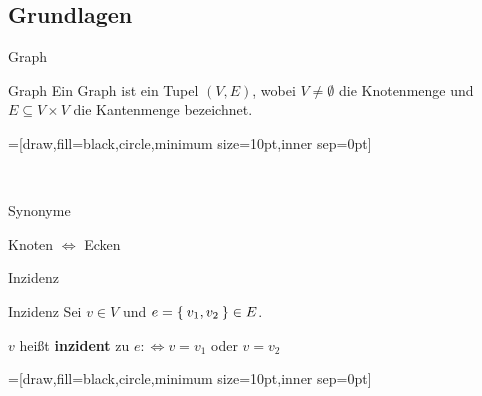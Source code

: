 \subsection{Grundlagen}
\begin{frame}{Graph}
\begin{block}{Graph}
Ein Graph ist ein Tupel $(V, E)$, wobei $V \neq \emptyset$ die Knotenmenge und 
$E \subseteq V \times V$ die 
Kantenmenge bezeichnet.
\end{block}
\pause
{}=[draw,fill=black,circle,minimum size=10pt,inner sep=0pt]

\begin{gallery}
    \\
\end{gallery}
\end{frame}

\begin{frame}{Synonyme}

\begin{center}
\Huge{Knoten $\Leftrightarrow$ Ecken}
\end{center}

\end{frame}

\begin{frame}{Inzidenz}
\begin{block}{Inzidenz}
Sei $v \in V$ und $e = \Set{v_1, v_2} \in E$.

$v$ heißt \textbf{inzident} zu $e :\Leftrightarrow v = v_1$ oder $v = v_2$
\end{block}

\pause
{}=[draw,fill=black,circle,minimum size=10pt,inner sep=0pt]

\begin{gallery}
    \\
\end{gallery}
\end{frame}

